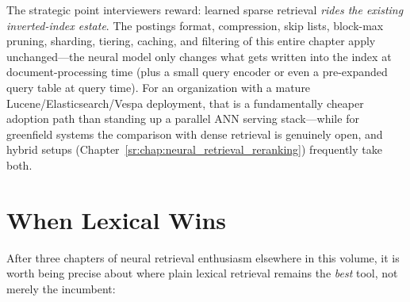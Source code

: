 The strategic point interviewers reward: learned sparse retrieval \emph{rides the existing inverted-index estate}. The postings format, compression, skip lists, block-max pruning, sharding, tiering, caching, and filtering of this entire chapter apply unchanged---the neural model only changes what gets written into the index at document-processing time (plus a small query encoder or even a pre-expanded query table at query time). For an organization with a mature Lucene/Elasticsearch/Vespa deployment, that is a fundamentally cheaper adoption path than standing up a parallel ANN serving stack---while for greenfield systems the comparison with dense retrieval is genuinely open, and hybrid setups (Chapter~\ref{sr:chap:neural_retrieval_reranking}) frequently take both.

\section{When Lexical Wins}
\label{sr:sec:when_lexical_wins}

After three chapters of neural retrieval enthusiasm elsewhere in this volume, it is worth being precise about where plain lexical retrieval remains the \emph{best} tool, not merely the incumbent:

